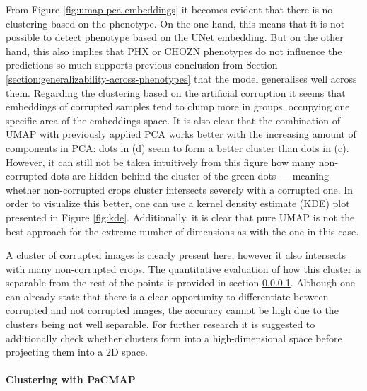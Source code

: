 From Figure \ref{fig:umap-pca-embeddings} it becomes evident that there is no clustering based on the phenotype. On the one hand, this means that it is not possible to detect phenotype based on the UNet embedding. But on the other hand, this also implies that PHX or CHOZN phenotypes do not influence the predictions so much supports previous conclusion from Section \ref{section:generalizability-across-phenotypes} that the model generalises well across them. Regarding the clustering based on the artificial corruption it seems that embeddings of corrupted samples tend to clump more in groups, occupying one specific area of the embeddings space. It is also clear that the combination of UMAP with previously applied PCA works better with the increasing amount of components in PCA: dots in (d) seem to form a better cluster than dots in (c). However, it can still not be taken intuitively from this figure how many non-corrupted dots are hidden behind the cluster of the green dots --- meaning whether non-corrupted crops cluster intersects severely with a corrupted one. In order to visualize this better, one can use a kernel density estimate (KDE) plot presented in Figure \ref{fig:kde}. Additionally, it is clear that pure UMAP is not the best approach for the extreme number of dimensions as with the one in this case.


A cluster of corrupted images is clearly present here, however it also intersects with many non-corrupted crops. The quantitative evaluation of how this cluster is separable from the rest of the points is provided in section \ref{section:clustering-on-unet-embeddings}. Although one can already state that there is a clear opportunity to differentiate between corrupted and not corrupted images, the accuracy cannot be high due to the clusters being not well separable. For further research it is suggested to additionally check whether clusters form into a high-dimensional space before projecting them into a 2D space. 

\paragraph{Clustering with PaCMAP}
\label{section:clustering-on-unet-embeddings}

